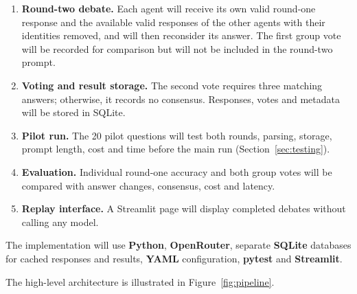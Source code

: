 \documentclass[12pt,a4paper]{article}
\begin{document}
\begin{enumerate}
    \item \textbf{Round-two debate.}
    Each agent will receive its own valid round-one response and the available
    valid responses of the other agents with their identities removed, and will
    then reconsider its answer. The first group vote will be recorded for comparison but will not be included in the round-two prompt.

    \item \textbf{Voting and result storage.}
    The second vote requires three matching answers; otherwise, it records no
    consensus. Responses, votes and metadata will be stored in SQLite.

    \item \textbf{Pilot run.}
    The 20 pilot questions will test both rounds, parsing, storage, prompt
    length, cost and time before the main run (Section~\ref{sec:testing}).

    \item \textbf{Evaluation.}
    Individual round-one accuracy and both group votes will be compared with
    answer changes, consensus, cost and latency.

    \item \textbf{Replay interface.}
    A Streamlit page will display completed debates without calling any model.

\end{enumerate}

The implementation will use \textbf{Python}, \textbf{OpenRouter}, separate
\textbf{SQLite} databases for cached responses and results, \textbf{YAML}
configuration, \textbf{pytest} and \textbf{Streamlit}.

The high-level architecture is illustrated in Figure~\ref{fig:pipeline}.
\end{document}
